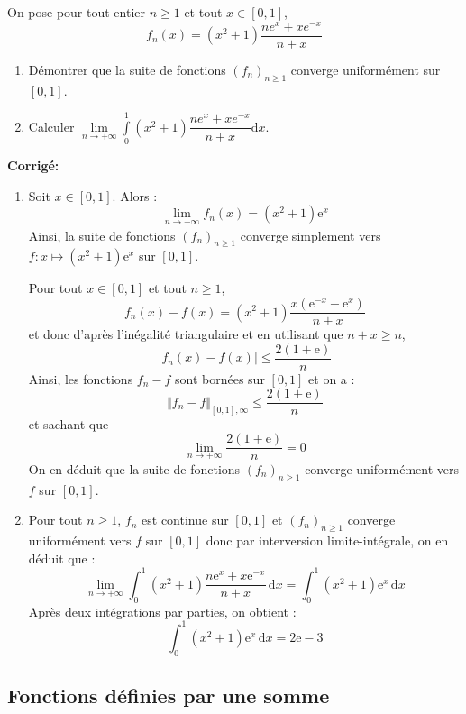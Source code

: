 \documentclass[a4paper,twoside,french,11pt]{VcCours}
\newcommand{\corr}{\textbf{Corrigé:}}
\begin{document}
\begin{Exercice}{} On pose pour tout entier $n \geq 1$ et tout $x \in [0,1]$,
$$f_{n}\left( x\right) =\left( x^{2}+1\right) \dfrac{ne^{x}+xe^{-x}}{n+x} $$

\begin{enumerate}
\item Démontrer que la suite de fonctions $\left( f_{n}\right) _{n \geq 1}$ converge uniformément sur $[0,1]$.
\item Calculer $\underset{n\rightarrow +\infty }{\lim }\int\limits_{0}^{1}\left( x^{2}+1\right) \dfrac{ne^{x}+xe^{-x}}{n+x}\text{d}x$.
\end{enumerate}
\end{Exercice} 

\corr \begin{enumerate}
\item Soit $x \in \left[ {0,1} \right]$. Alors :
$$\lim\limits_{n\to +\infty}^{}f_n (x)=(x^2  + 1){\mathrm{e}}^x $$
Ainsi, la suite de fonctions $(f_n)_{n \geq 1}$ converge simplement vers $f:x \mapsto (x^2  + 1){\mathrm{e}}^x $ sur $\left[ {0,1} \right]$.
\medskip

Pour tout $x\in \left[ 0,1\right]$ et tout $n \geq 1$, 
$$f_n (x) - f(x) = (x^2  + 1)\dfrac{{x({\mathrm{e}}^{ - x}  - {\mathrm{e}}^x )}}{{n + x}}$$
et donc d'après l'inégalité triangulaire et en utilisant que $n+x \geq n$,
$$\left| {f_n (x) - f(x)} \right| \leq \dfrac{{2(1+\textrm{e})}}{n}$$
Ainsi, les fonctions $f_n-f$ sont bornées sur $[0,1]$ et on a :
$$ \Vert f_n -f \Vert_{[0,1], \infty} \leq \dfrac{{2(1+\textrm{e})}}{n}$$
et sachant que 
$$ \lim_{n \rightarrow + \infty} \dfrac{{2(1+\textrm{e})}}{n} = 0 $$
On en déduit que la suite de fonctions $(f_n)_{n \geq 1}$ converge uniformément vers $f$ sur $\left[ {0,1} \right]$.
\item Pour tout $n \geq 1$, $f_n$ est continue sur $[0,1]$ et $(f_n)_{n \geq 1}$ converge uniformément vers $f$ sur $\left[ {0,1} \right]$ donc par interversion limite-intégrale, on en déduit que :
$$\mathop {\lim }\limits_{n \to  + \infty } \int_0^1 {(x^2  + 1)\dfrac{{n{\mathrm{e}}^x  + x{\mathrm{e}}^{ - x} }}{{n + x}}\,{\mathrm{d}}x}  = \int_0^1 {(x^2  + 1){\mathrm{e}}^x \,{\mathrm{d}}x} $$
Après deux intégrations par parties, on obtient :
$$\int_0^1 {(x^2  + 1){\mathrm{e}}^x \,{\mathrm{d}}x}  = 2{\mathrm{e}} - 3$$
\end{enumerate}


\subsection{Fonctions définies par une somme}
\end{document}
